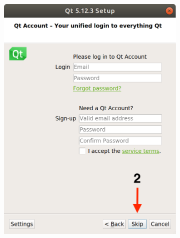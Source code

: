 \begin{figure}[H]
\begin{subfigure}{0.32\linewidth}
        \includegraphics[width=1\textwidth]{images/Qt2.png}
    \end{subfigure}
    \begin{subfigure}{0.32\linewidth}

\end{subfigure}
\end{figure}
